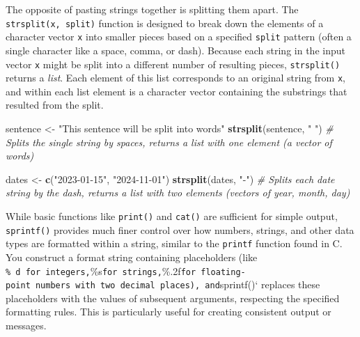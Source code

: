 \documentclass[
]{book}
\newenvironment{Shaded}{\begin{snugshade}}{\end{snugshade}}
\newcommand{\CommentTok}[1]{\textcolor[rgb]{0.56,0.35,0.01}{\textit{#1}}}
\newcommand{\FunctionTok}[1]{\textcolor[rgb]{0.13,0.29,0.53}{\textbf{#1}}}
\newcommand{\NormalTok}[1]{#1}
\newcommand{\OtherTok}[1]{\textcolor[rgb]{0.56,0.35,0.01}{#1}}
\newcommand{\StringTok}[1]{\textcolor[rgb]{0.31,0.60,0.02}{#1}}
\begin{document}
The opposite of pasting strings together is splitting them apart. The \texttt{strsplit(x,\ split)} function is designed to break down the elements of a character vector \texttt{x} into smaller pieces based on a specified \texttt{split} pattern (often a single character like a space, comma, or dash). Because each string in the input vector \texttt{x} might be split into a different number of resulting pieces, \texttt{strsplit()} returns a \emph{list}. Each element of this list corresponds to an original string from \texttt{x}, and within each list element is a character vector containing the substrings that resulted from the split.

\begin{Shaded}
\begin{Highlighting}[]
\NormalTok{sentence }\OtherTok{\textless{}{-}} \StringTok{"This sentence will be split into words"}
\FunctionTok{strsplit}\NormalTok{(sentence, }\StringTok{" "}\NormalTok{)  }\CommentTok{\# Splits the single string by spaces, returns a list with one element (a vector of words)}

\NormalTok{dates }\OtherTok{\textless{}{-}} \FunctionTok{c}\NormalTok{(}\StringTok{"2023{-}01{-}15"}\NormalTok{, }\StringTok{"2024{-}11{-}01"}\NormalTok{)}
\FunctionTok{strsplit}\NormalTok{(dates, }\StringTok{"{-}"}\NormalTok{)  }\CommentTok{\# Splits each date string by the dash, returns a list with two elements (vectors of year, month, day)}
\end{Highlighting}
\end{Shaded}

While basic functions like \texttt{print()} and \texttt{cat()} are sufficient for simple output, \texttt{sprintf()} provides much finer control over how numbers, strings, and other data types are formatted within a string, similar to the \texttt{printf} function found in C. You construct a format string containing placeholders (like \texttt{\%\ d\textquotesingle{}\ for\ integers,}\%s\texttt{for\ strings,}\%.2f\texttt{for\ floating-point\ numbers\ with\ two\ decimal\ places),\ and}sprintf()` replaces these placeholders with the values of subsequent arguments, respecting the specified formatting rules. This is particularly useful for creating consistent output or messages.
\end{document}
